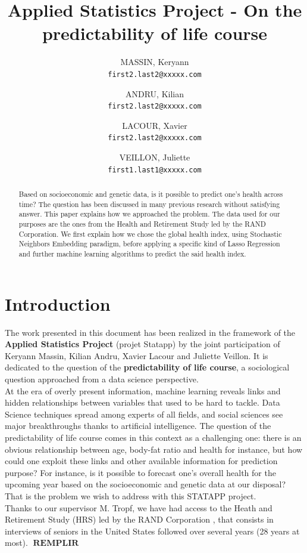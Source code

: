 \documentclass[]{article}
\title{Applied Statistics Project - On the predictability of life course}
\author{
	MASSIN, Keryann\\
	\texttt{first2.last2@xxxxx.com}
	\and
	ANDRU, Kilian\\
	\texttt{first2.last2@xxxxx.com}
	\and
	LACOUR, Xavier\\
	\texttt{first2.last2@xxxxx.com}
	\and
	VEILLON, Juliette\\
	\texttt{first1.last1@xxxxx.com}
}
\DeclareMathOperator*{\towrite}{\textbf{REMPLIR}}
\begin{document}
\newcommand{\sklearn}{\textbf{scikit-learn}}
\maketitle
\begin{abstract}
	Based on socioeconomic and genetic data, is it possible to predict one's health across time? The question has been discussed in many previous research without satisfying answer. This paper explains how we approached the problem. The data used for our purposes are the ones from the Health and Retirement Study led by the RAND Corporation. We first explain how we chose the global health index, using Stochastic Neighbors Embedding paradigm, before applying a specific kind of Lasso Regression and further machine learning algorithms to predict the said health index.
\end{abstract}
\newpage
\tableofcontents
\newpage
\section{Introduction}
The work presented in this document has been realized in the framework of the \textbf{Applied Statistics Project} (projet Statapp) by the joint participation of Keryann Massin, Kilian Andru, Xavier Lacour and Juliette Veillon. It is dedicated to the question of the \textbf{predictability of life course}, a sociological question approached from a data science perspective.\\

\noindent
At the era of overly present information, machine learning reveals links and hidden relationships between variables that used to be hard to tackle. Data Science techniques spread among experts of all fields, and social sciences see major breakthroughs thanks to artificial intelligence. The question of the predictability of life course comes in this context as a challenging one: there is an obvious relationship between age, body-fat ratio and health for instance, but how could one exploit these links and other available information for prediction purpose? For instance, is it possible to forecast one's overall health for the upcoming year based on the socioeconomic and genetic data at our disposal? That is the problem we wish to address with this STATAPP project.\\

\noindent
Thanks to our supervisor M. Tropf, we have had access to the Heath and Retirement Study (HRS) led by the RAND Corporation \cite{hrs2014}, that consists in interviews of seniors in the United States followed over several years (28 years at most). $\towrite$\\
\end{document}
